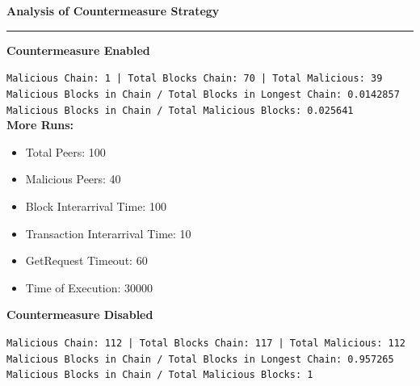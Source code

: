 \documentclass[a4paper,12pt]{article}
\newenvironment{solution}[2][]{%
\begin{mdframed}[linecolor=blue!70!black, linewidth=2pt, roundcorner=10pt, backgroundcolor=yellow!10!white, skipabove=12pt, skipbelow=12pt]%
	\textbf{\large #2}
	\par\noindent\rule{\textwidth}{0.4pt}
}{
\end{mdframed}
}
\begin{document}
\begin{solution}{Analysis of Countermeasure Strategy}
\textbf{Countermeasure Enabled}
\vspace{0pt}
\begin{figure}[H]
\centering
{} 

\end{figure}
\vspace{-15pt}
\texttt{Malicious Chain: 1 |
Total Blocks Chain: 70 |
Total Malicious: 39\\
Malicious Blocks in Chain / Total Blocks in Longest Chain: 0.0142857\\
Malicious Blocks in Chain / Total Malicious Blocks: 0.025641}\\

\textbf{More Runs:}
\begin{itemize}
	\vspace{-7pt}
	\item Total Peers: 100
	\vspace{-7pt}
	\item Malicious Peers: 40
	\vspace{-7pt}
	\item Block Interarrival Time: 100
	\vspace{-7pt}
	\item Transaction Interarrival Time: 10
	\vspace{-7pt}
	\item GetRequest Timeout: 60 
	\vspace{-7pt}
	\item Time of Execution: 30000
\end{itemize}



\textbf{Countermeasure Disabled}
\begin{figure}[H]
\centering
{} 

\end{figure}
\vspace{-15pt}
\texttt{Malicious Chain: 112 |
Total Blocks Chain: 117 |
Total Malicious: 112\\
Malicious Blocks in Chain / Total Blocks in Longest Chain: 0.957265\\
Malicious Blocks in Chain / Total Malicious Blocks: 1}\\


\end{solution}
\end{document}
